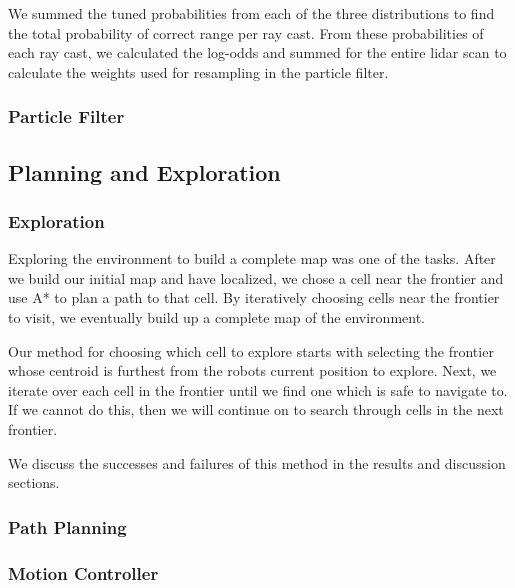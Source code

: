 \documentclass[journal]{IEEEtran}
\begin{document}
            We summed the tuned probabilities from each of the three distributions to find the total probability of correct range per ray cast. From these probabilities of each ray cast, we calculated the log-odds and summed for the entire lidar scan to calculate the weights used for resampling in the particle filter.
            
        \subsubsection{Particle Filter}
        
        
    \subsection{Planning and Exploration}
        
        \subsubsection{Exploration}
        
            Exploring the environment to build a complete map was one of the tasks. After we build our initial map and have localized, we chose a cell near the frontier and use A* to plan a path to that cell. By iteratively choosing cells near the frontier to visit, we eventually build up a complete map of the environment.
            
            Our method for choosing which cell to explore starts with selecting the frontier whose centroid is furthest from the robots current position to explore. Next, we iterate over each cell in the frontier until we find one which is safe to navigate to. If we cannot do this, then we will continue on to search through cells in the next frontier.
            
            We discuss the successes and failures of this method in the results and discussion sections.
        
        \subsubsection{Path Planning}
        
        
        \subsubsection{Motion Controller}
        
\end{document}
